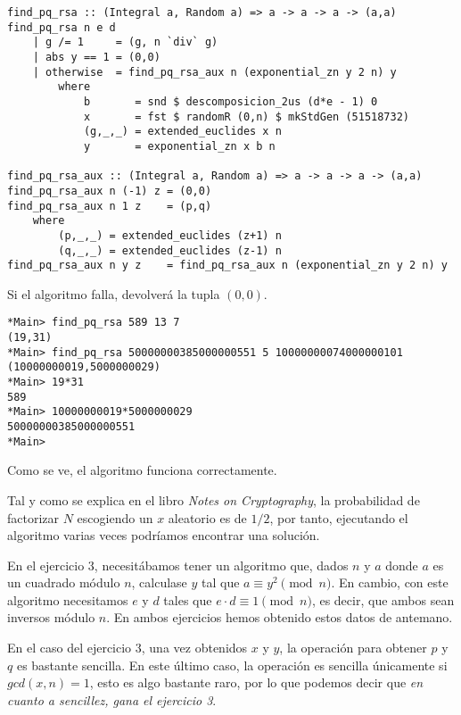 \documentclass[10pt,spanish]{article}
\begin{document}
\begin{verbatim}
find_pq_rsa :: (Integral a, Random a) => a -> a -> a -> (a,a)
find_pq_rsa n e d
    | g /= 1     = (g, n `div` g)
    | abs y == 1 = (0,0)
    | otherwise  = find_pq_rsa_aux n (exponential_zn y 2 n) y
        where
            b       = snd $ descomposicion_2us (d*e - 1) 0
            x       = fst $ randomR (0,n) $ mkStdGen (51518732)
            (g,_,_) = extended_euclides x n
            y       = exponential_zn x b n

find_pq_rsa_aux :: (Integral a, Random a) => a -> a -> a -> (a,a)
find_pq_rsa_aux n (-1) z = (0,0)
find_pq_rsa_aux n 1 z    = (p,q)
    where
        (p,_,_) = extended_euclides (z+1) n
        (q,_,_) = extended_euclides (z-1) n
find_pq_rsa_aux n y z    = find_pq_rsa_aux n (exponential_zn y 2 n) y 
\end{verbatim}

Si el algoritmo falla, devolverá la tupla $(0,0)$.

\begin{verbatim}
*Main> find_pq_rsa 589 13 7
(19,31)
*Main> find_pq_rsa 50000000385000000551 5 10000000074000000101
(10000000019,5000000029)
*Main> 19*31
589
*Main> 10000000019*5000000029
50000000385000000551
*Main> 
\end{verbatim}

Como se ve, el algoritmo funciona correctamente. 

Tal y como se explica en el libro \textit{\textcolor{azul}{Notes on Cryptography}}, la probabilidad de factorizar $N$ escogiendo un $x$ aleatorio es de $1/2$, por tanto, ejecutando el algoritmo varias veces podríamos encontrar una solución.

En el ejercicio 3, necesitábamos tener un algoritmo que, dados $n$ y $a$ donde $a$ es un cuadrado módulo $n$, calculase $y$ tal que $a \equiv y^2 \pmod n$. En cambio, con este algoritmo necesitamos $e$ y $d$ tales que $e \cdot d \equiv 1 \pmod n$, es decir, que ambos sean inversos módulo $n$. En ambos ejercicios hemos obtenido estos datos de antemano.

En el caso del ejercicio 3, una vez obtenidos $x$ y $y$, la operación para obtener $p$ y $q$ es bastante sencilla. En este último caso, la operación es sencilla únicamente si $gcd(x,n) = 1$, esto es algo bastante raro, por lo que podemos decir que \textit{\textcolor{azul}{en cuanto a sencillez, gana el ejercicio 3}}.
\end{document}
